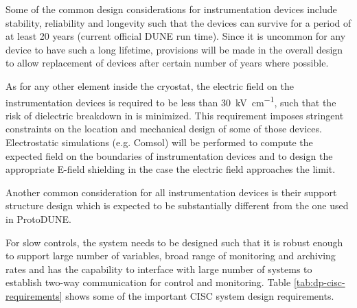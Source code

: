 Some of the common design considerations for
instrumentation devices include stability, reliability and longevity
such that the devices can survive for a period of at least 20 years
(current official DUNE run time).  Since it is uncommon for any device
to have such a long lifetime, provisions will be made in the overall
design to allow replacement of devices after certain number of
years where possible.

As for any other element inside the cryostat, 
the electric field on the instrumentation devices is 
required to be less than \SI{30}{kV\per\cm},
such that the risk of dielectric breakdown in  is minimized.
This requirement imposes stringent constraints on the location and mechanical 
design of some of those devices. Electrostatic simulations (e.g. Comsol) 
will be performed to compute the expected field on the boundaries of 
instrumentation devices and to design the appropriate E-field shielding
in the case the electric field approaches the limit. 

Another common consideration for all instrumentation devices is their support structure
design which is expected to be substantially different from the one used in ProtoDUNE.

For slow controls, the system needs to be designed such that it is
robust enough to support large number of variables, broad range of
monitoring and archiving rates and has the capability to interface
with large number of systems to establish two-way communication for
control and monitoring. Table \ref{tab:dp-cisc-requirements} shows
some of the important CISC system design requirements.




